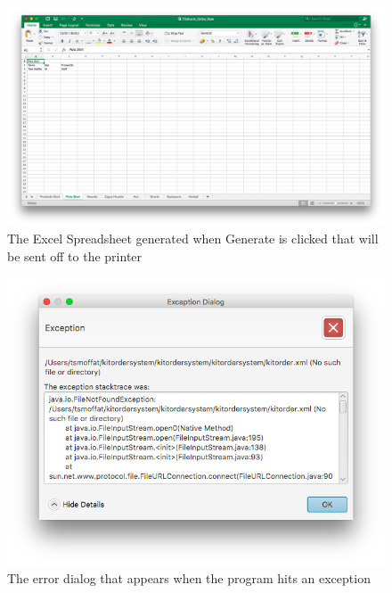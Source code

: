 \documentclass[11pt]{report}
\begin{document}
\begin{figure}[H]
	\centering
	\includegraphics[width=\linewidth]{OutputExcel}
	\caption{The Excel Spreadsheet generated when Generate is clicked that will be sent off to the printer}
	\label{oe}
\end{figure}
\begin{figure}
	\centering
	\includegraphics[scale=0.5]{JavaUpdatedError}
	\caption{The error dialog that appears when the program hits an exception}
	\label{jue}	
\end{figure}
\end{document}
